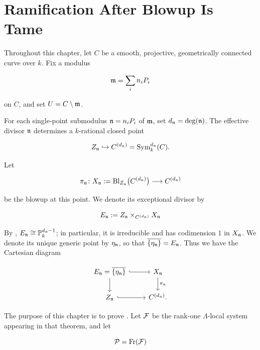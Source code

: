 
\chapter{Ramification After Blowup Is Tame}

Throughout this chapter, let $C$ be a smooth, projective, geometrically connected
curve over $k$. Fix a modulus

\[
    \mathfrak{m} = \sum_i n_i P_i
\]

on $C$, and set $U = C \setminus \mathfrak{m}$.

For each single-point submodulus $\mathfrak{n} = n_i P_i$ of $\mathfrak{m}$, set
$d_{\mathfrak{n}} = \deg(\mathfrak{n})$. The effective divisor $\mathfrak{n}$ determines a
$k$-rational closed point

\[
    Z_{\mathfrak{n}} \hookrightarrow C^{(d_{\mathfrak{n}})}
        = \operatorname{Sym}^{d_{\mathfrak{n}}}_k(C).
\]

Let

\[
    \pi_{\mathfrak{n}} \colon
    X_{\mathfrak{n}} := \operatorname{Bl}_{Z_{\mathfrak{n}}}\bigl(C^{(d_{\mathfrak{n}})}\bigr)
    \longrightarrow C^{(d_{\mathfrak{n}})}
\]

be the blowup at this point. We denote its exceptional divisor by

\[
    E_{\mathfrak{n}} := Z_{\mathfrak{n}} \times_{C^{(d_{\mathfrak{n}})}} X_{\mathfrak{n}}
\]

By
,
$E_{\mathfrak{n}}\cong\mathbb P_k^{d_{\mathfrak{n}}-1}$; in particular, it is irreducible and
has codimension $1$ in $X_{\mathfrak{n}}$. We denote its unique generic point by
$\eta_{\mathfrak{n}}$, so that $\overline{\{\eta_{\mathfrak{n}}\}}=E_{\mathfrak{n}}$. Thus we have the
Cartesian diagram

\begin{equation}\label{equation:blowup_diagram_ndls:reorg}
\begin{tikzcd}
E_\ndls = \overline{\{\eta_\ndls\}}
    \arrow[r, hook] \arrow[d]
  & X_\ndls \arrow[d, "\pi_\ndls"] \\
Z_\ndls \arrow[r, hook]
  & C^{(d_\ndls)}.
\end{tikzcd}
\end{equation}

The purpose of this chapter is to prove
. Let $\mathcal{F}$ be
the rank-one $\Lambda$-local system appearing in that theorem, and let

\[
    \mathcal{P} = \operatorname{Fr}(\mathcal{F})
\]

